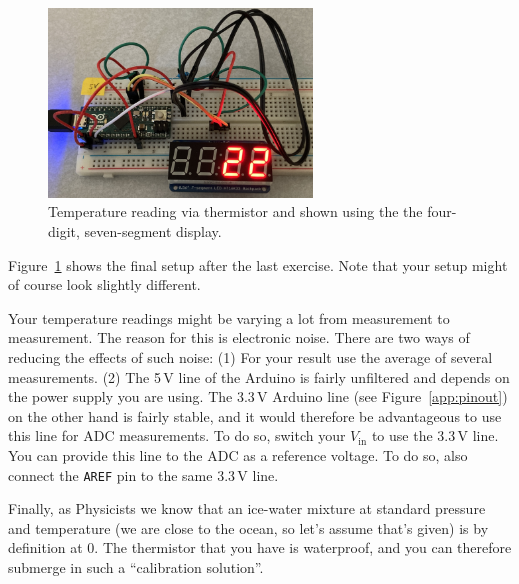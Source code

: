 
\begin{figure}[tb]
    \centering
    \includegraphics[width=0.625\textwidth]{graphics/03_temperature/final_setup.png}
    \caption{Temperature reading via thermistor and shown using the the four-digit, seven-segment display.}
    \label{fig:temperature:final_setup}
\end{figure}
Figure~\ref{fig:temperature:final_setup} shows the final setup after the last exercise. Note that your setup might of course look slightly different.

Your temperature readings might be varying a lot from measurement to measurement. The reason for this is electronic noise. There are two ways of reducing the effects of such noise: (1) For your result use the average of several measurements. (2) The 5\,V line of the Arduino is fairly unfiltered and depends on the power supply you are using. The 3.3\,V Arduino line (see Figure~\ref{app:pinout}) on the other hand is fairly stable, and it would therefore be advantageous to use this line for ADC measurements. To do so, switch your $V_\mathrm{in}$ to use the 3.3\,V line. You can provide this line to the ADC as a reference voltage. To do so, also connect the \lstinline{AREF} pin to the same 3.3\,V line.


Finally, as Physicists we know that an ice-water mixture at standard pressure and temperature (we are close to the ocean, so let's assume that's given) is by definition at 0\celsius. The thermistor that you have is waterproof, and you can therefore submerge in such a ``calibration solution''.

